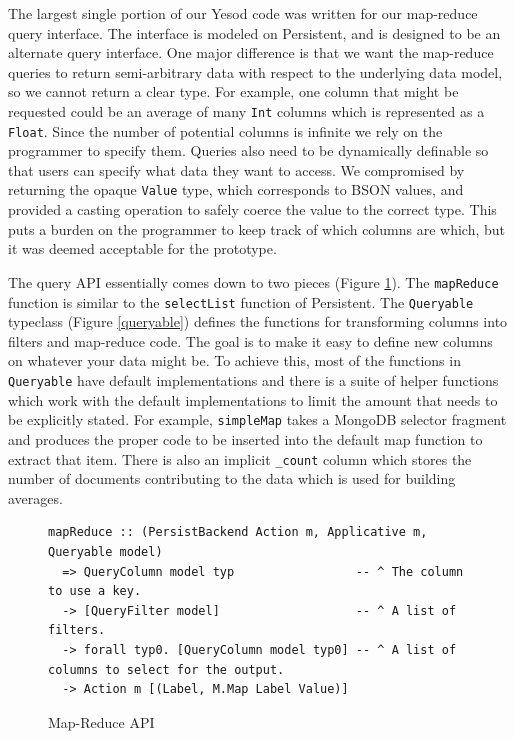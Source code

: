\documentclass[letterpaper,twocolumn,9pt]{article}
\newcommand{\code}[1]{\texttt{#1}}
\begin{document}
The largest single portion of our Yesod code was written for our map-reduce query interface.  The interface is modeled on Persistent, and is designed to be an alternate query interface.  One major difference is that we want the map-reduce queries to return semi-arbitrary data with respect to the underlying data model, so we cannot return a clear type.  For example, one column that might be requested could be an average of many \code{Int} columns which is represented as a \code{Float}.  Since the number of potential columns is infinite we rely on the programmer to specify them.  Queries also need to be dynamically definable so that users can specify what data they want to access.  We compromised by returning the opaque \code{Value} type, which corresponds to BSON values, and provided a casting operation to safely coerce the value to the correct type.  This puts a burden on the programmer to keep track of which columns are which, but it was deemed acceptable for the prototype.

The query API essentially comes down to two pieces (Figure \ref{mrapi}).  The \code{mapReduce} function is similar to the \code{selectList} function of Persistent.  The \code{Queryable} typeclass (Figure \ref{queryable}) defines the functions for transforming columns into filters and map-reduce code.  The goal is to make it easy to define new columns on whatever your data might be.  To achieve this, most of the functions in \code{Queryable} have default implementations and there is a suite of helper functions which work with the default implementations to limit the amount that needs to be explicitly stated. For example, \code{simpleMap} takes a MongoDB selector fragment and produces the proper code to be inserted into the default map function to extract that item.  There is also an implicit \code{\_count} column which stores the number of documents contributing to the data which is used for building averages.

\begin{figure}[t]
\footnotesize{
\begin{verbatim}
mapReduce :: (PersistBackend Action m, Applicative m, Queryable model)
  => QueryColumn model typ                 -- ^ The column to use a key.
  -> [QueryFilter model]                   -- ^ A list of filters.
  -> forall typ0. [QueryColumn model typ0] -- ^ A list of columns to select for the output.
  -> Action m [(Label, M.Map Label Value)]
\end{verbatim}
}
    \caption{Map-Reduce API}
    \label{mrapi}
\end{figure}
\end{document}
